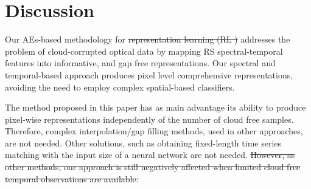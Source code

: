 \documentclass[journal,article,submit,pdftex,moreauthors]{Definitions/mdpi}
\providecommand{\DIFadd}[1]{{\protect\color{blue}\uwave{#1}}} %
\providecommand{\DIFdel}[1]{{\protect\color{red}\sout{#1}}}                      %
\providecommand{\DIFaddbegin}{} %
\providecommand{\DIFaddend}{} %
\providecommand{\DIFdelbegin}{} %
\providecommand{\DIFdelend}{} %
\begin{document}


\DIFaddend %
\section{Discussion}
Our AEs-based methodology for \DIFdelbegin \DIFdel{representation learning (RL ) }\DIFdelend \DIFaddbegin \DIFadd{RL }\DIFaddend addresses the problem of cloud-corrupted optical data by mapping RS spectral-temporal features into informative, and gap free representations.
Our spectral and temporal-based approach produces pixel level comprehensive representations, avoiding the need to employ complex spatial-based classifiers.

The method proposed in this paper has as main advantage its ability to produce pixel-wise representations independently of the number of cloud free samples.
Therefore, complex interpolation/gap filling methods, used in other approaches, are not needed.
Other solutions, such as obtaining fixed-length time series matching with the input size of a neural network are not needed.
\DIFdelbegin \DIFdel{However, as other methods, our approach is still negatively affected when limited cloud free temporal observations are available.
}\DIFdelend 

\end{document}
